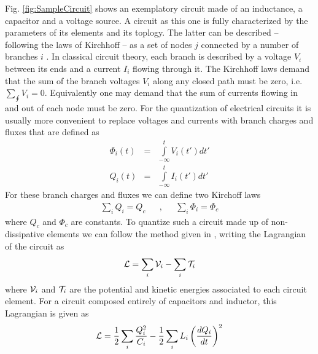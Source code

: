 Fig. \ref{fig:SampleCircuit} shows an exemplatory circuit made of an inductance, a capacitor and a voltage source. A circuit as this one is fully characterized by the parameters of its elements and its toplogy. The latter can be described -- following the laws of Kirchhoff -- as a set of nodes $j$ connected by a number of branches $i$ . In classical circuit theory, each branch is described by a voltage $V_i$ between its ends and a current $I_{i}$ flowing through it. The Kirchhoff laws demand that the sum of the branch voltages $V_i$ along any closed path must be zero, i.e. $\sum\limits_{\oint} V_i = 0$. Equivalently one may demand that the sum of currents flowing in and out of each node must be zero. For the quantization of electrical circuits it is usually more convenient to replace voltages and currents with branch charges and fluxes that are defined as
%
\begin{eqnarray}
\Phi_i(t) & = & \int\limits_{-\infty}^t V_i(t') dt' \\
Q_i(t) & = & \int\limits_{-\infty}^t I_i(t') dt'
\end{eqnarray}
%
For these branch charges and fluxes we can define two Kirchoff laws
%
\begin{align}
\sum\limits_{i} Q_i  =  Q_c & & , & & \sum\limits_{i}\Phi_i = \Phi_c \label{eq:kirchhoff_charge}
\end{align}
%
where $Q_c$ and $\Phi_c$ are constants. To quantize such a circuit made up of non-dissipative elements we can follow the method given in \cite{yurke_quantum_1984}, writing the Lagrangian of the circuit as 
%
\begin{equation}
\begin{mathcal}L\end{mathcal} = \sum\limits_i \begin{mathcal}V\end{mathcal}_i - \sum\limits_i \begin{mathcal}T\end{mathcal}_i
\end{equation}
%
where $\begin{mathcal}V\end{mathcal}_i$ and $\begin{mathcal}T\end{mathcal}_i$ are the potential and kinetic energies associated to each circuit element. For a circuit composed entirely of capacitors and inductor, this Lagrangian is given as
%
\begin{equation}
\begin{mathcal}L\end{mathcal} = \frac{1}{2}\sum\limits_i \frac{Q_i^2}{C_i}-\frac{1}{2}\sum\limits_i L_i \left( \frac{dQ_i}{dt}\right)^2 \label{eq:circuit_lagrangian}
\end{equation}

